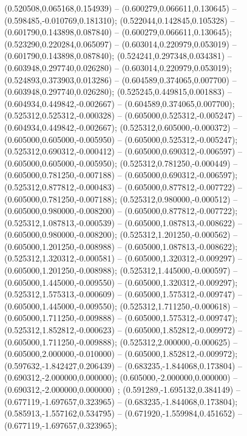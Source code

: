  (0.520508,0.065168,0.154939) -- (0.600279,0.066611,0.130645) -- (0.598485,-0.010769,0.181310);
 (0.522044,0.142845,0.105328) -- (0.601790,0.143898,0.087840) -- (0.600279,0.066611,0.130645);
 (0.523290,0.220284,0.065097) -- (0.603014,0.220979,0.053019) -- (0.601790,0.143898,0.087840);
 (0.524241,0.297348,0.034381) -- (0.603948,0.297740,0.026280) -- (0.603014,0.220979,0.053019);
 (0.524893,0.373903,0.013286) -- (0.604589,0.374065,0.007700) -- (0.603948,0.297740,0.026280);
 (0.525245,0.449815,0.001883) -- (0.604934,0.449842,-0.002667) -- (0.604589,0.374065,0.007700);
 (0.525312,0.525312,-0.000328) -- (0.605000,0.525312,-0.005247) -- (0.604934,0.449842,-0.002667);
 (0.525312,0.605000,-0.000372) -- (0.605000,0.605000,-0.005950) -- (0.605000,0.525312,-0.005247);
 (0.525312,0.690312,-0.000412) -- (0.605000,0.690312,-0.006597) -- (0.605000,0.605000,-0.005950);
 (0.525312,0.781250,-0.000449) -- (0.605000,0.781250,-0.007188) -- (0.605000,0.690312,-0.006597);
 (0.525312,0.877812,-0.000483) -- (0.605000,0.877812,-0.007722) -- (0.605000,0.781250,-0.007188);
 (0.525312,0.980000,-0.000512) -- (0.605000,0.980000,-0.008200) -- (0.605000,0.877812,-0.007722);
 (0.525312,1.087813,-0.000539) -- (0.605000,1.087813,-0.008622) -- (0.605000,0.980000,-0.008200);
 (0.525312,1.201250,-0.000562) -- (0.605000,1.201250,-0.008988) -- (0.605000,1.087813,-0.008622);
 (0.525312,1.320312,-0.000581) -- (0.605000,1.320312,-0.009297) -- (0.605000,1.201250,-0.008988);
 (0.525312,1.445000,-0.000597) -- (0.605000,1.445000,-0.009550) -- (0.605000,1.320312,-0.009297);
 (0.525312,1.575313,-0.000609) -- (0.605000,1.575312,-0.009747) -- (0.605000,1.445000,-0.009550);
 (0.525312,1.711250,-0.000618) -- (0.605000,1.711250,-0.009888) -- (0.605000,1.575312,-0.009747);
 (0.525312,1.852812,-0.000623) -- (0.605000,1.852812,-0.009972) -- (0.605000,1.711250,-0.009888);
 (0.525312,2.000000,-0.000625) -- (0.605000,2.000000,-0.010000) -- (0.605000,1.852812,-0.009972);
 (0.597632,-1.842427,0.206439) -- (0.683235,-1.844068,0.173804) -- (0.690312,-2.000000,0.000000);
 (0.605000,-2.000000,0.000000) -- (0.690312,-2.000000,0.000000) ;
 (0.591289,-1.695132,0.384149) -- (0.677119,-1.697657,0.323965) -- (0.683235,-1.844068,0.173804);
 (0.585913,-1.557162,0.534795) -- (0.671920,-1.559984,0.451652) -- (0.677119,-1.697657,0.323965);
